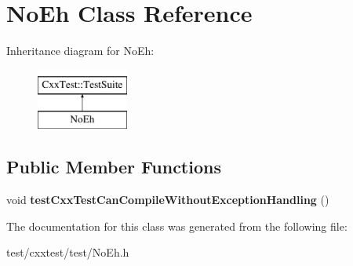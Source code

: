 \hypertarget{classNoEh}{\section{No\-Eh Class Reference}
\label{classNoEh}
}
Inheritance diagram for No\-Eh\-:\begin{figure}[H]
\begin{center}
\leavevmode
\includegraphics[height=2.000000cm]{classNoEh}
\end{center}
\end{figure}
\subsection*{Public Member Functions}
\begin{DoxyCompactItemize}
\item 
\hypertarget{classNoEh_ad217645c275fb759f28148247ee23407}{void {\bfseries test\-Cxx\-Test\-Can\-Compile\-Without\-Exception\-Handling} ()}\label{classNoEh_ad217645c275fb759f28148247ee23407}

\end{DoxyCompactItemize}


The documentation for this class was generated from the following file\-:\begin{DoxyCompactItemize}
\item 
test/cxxtest/test/No\-Eh.\-h\end{DoxyCompactItemize}
